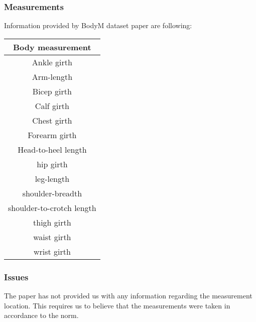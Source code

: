 \subsubsection{Measurements}
Information provided by BodyM dataset  paper are following:

\begin{center}
	\begin{tabular}{c}
		\hline
		Body measurement\\
		\hline
		\hline
		Ankle girth\\
		Arm-length\\
		Bicep girth\\ 
		Calf girth\\ 
		Chest girth\\ 
		Forearm girth\\
		Head-to-heel length\\
		hip girth\\
		leg-length\\
		shoulder-breadth\\
		shoulder-to-crotch length\\
		thigh girth\\
		waist girth\\
		wrist girth 
	\end{tabular}
\end{center}
\subsubsection{Issues}
The paper has not provided us with any information regarding the measurement location. This requires us to believe that the measurements were taken in accordance to the norm.